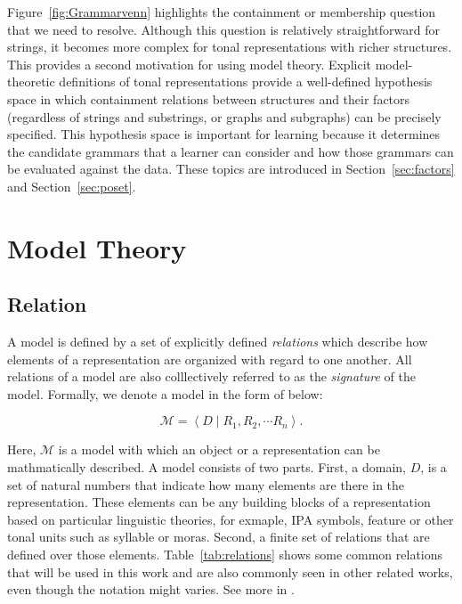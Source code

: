 Figure~\ref{fig:Grammarvenn} highlights the containment or membership question 
that we need to resolve. Although this question is relatively straightforward 
for strings, it becomes more complex for tonal representations with richer 
structures. This provides a second motivation for using model theory. Explicit 
model-theoretic definitions of tonal representations provide a well-defined 
hypothesis space in which containment relations between structures and their 
factors (regardless of strings and substrings, or graphs and subgraphs) can be 
precisely specified. This hypothesis space is important for learning because it 
determines the candidate grammars that a learner can consider and how those grammars can be evaluated against the data. These topics are introduced in 
Section~\ref{sec:factors} and Section~\ref{sec:poset}.



\section{Model Theory} 

\label{sec:formal_prelim} 

\subsection{Relation}
A model is defined by a set of explicitly defined \textit{relations} which 
describe how elements of a representation are organized with regard to one 
another. All relations of a model are also colllectively referred to as the 
\textit{signature} of the model. Formally, we denote a model in the form of below:

\[
\mathcal{M} = 
\left\langle
D \mid R_1, R_2,\cdots R_n
\right\rangle.
\]


Here, \(\mathcal{M}\) is a model with which an object or a representation
can be mathmatically described. A model consists of two parts. First, 
a domain, \(D\), is a set of natural numbers that indicate how many 
elements are there in the representation. These elements can be any 
building blocks of a representation based on particular linguistic 
theories, for exmaple, IPA symbols, feature or other tonal units
such as syllable or moras. Second, a finite set of relations that are 
defined over those elements. Table~\ref{tab:relations} shows some common 
relations that will be used in this work and are also commonly seen
in other related works, even though the notation might varies. See more in 
\citet{strother2017using,oakdenNotationalEquivalenceTonal2020,chandleeBufia2019}.

